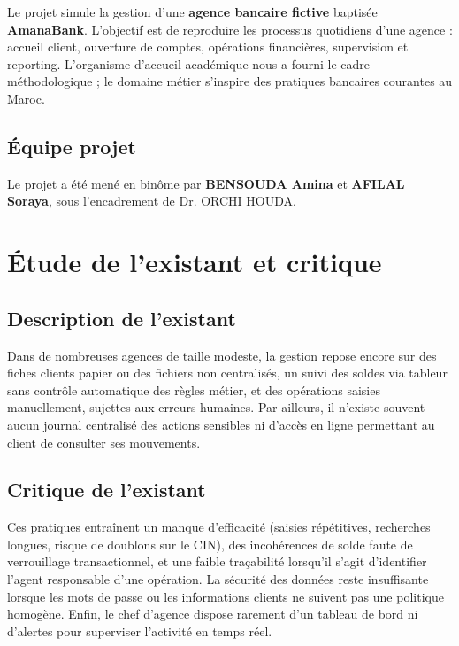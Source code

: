\documentclass[11pt,a4paper,oneside]{report}
\newcommand{\etudianteun}{BENSOUDA Amina}
\newcommand{\etudiantedeux}{AFILAL Soraya}
\newcommand{\encadrante}{Dr. ORCHI HOUDA}
\newcommand{\nomapplication}{AmanaBank}
\begin{document}
Le projet simule la gestion d'une \textbf{agence bancaire fictive} baptisée \textbf{\nomapplication}. L'objectif est de reproduire les processus quotidiens d'une agence : accueil client, ouverture de comptes, opérations financières, supervision et reporting. L'organisme d'accueil académique nous a fourni le cadre méthodologique ; le domaine métier s'inspire des pratiques bancaires courantes au Maroc.

\subsection{Équipe projet}

Le projet a été mené en binôme par \textbf{\etudianteun} et \textbf{\etudiantedeux}, sous l'encadrement de \encadrante.

\section{Étude de l'existant et critique}

\subsection{Description de l'existant}

Dans de nombreuses agences de taille modeste, la gestion repose encore sur des fiches clients papier ou des fichiers non centralisés, un suivi des soldes via tableur sans contrôle automatique des règles métier, et des opérations saisies manuellement, sujettes aux erreurs humaines. Par ailleurs, il n'existe souvent aucun journal centralisé des actions sensibles ni d'accès en ligne permettant au client de consulter ses mouvements.

\subsection{Critique de l'existant}

Ces pratiques entraînent un manque d'efficacité (saisies répétitives, recherches longues, risque de doublons sur le CIN), des incohérences de solde faute de verrouillage transactionnel, et une faible traçabilité lorsqu'il s'agit d'identifier l'agent responsable d'une opération. La sécurité des données reste insuffisante lorsque les mots de passe ou les informations clients ne suivent pas une politique homogène. Enfin, le chef d'agence dispose rarement d'un tableau de bord ni d'alertes pour superviser l'activité en temps réel.
\end{document}
